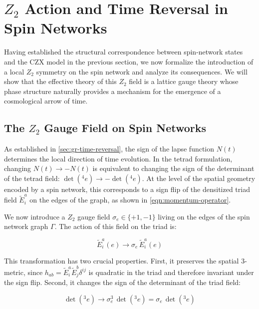 \section{\texorpdfstring{\(Z_2\) Action and Time Reversal in Spin Networks}{Z\_2 Action and Time Reversal in Spin Networks}}\label{sec:z2-action}

Having established the structural correspondence between spin-network states and the CZX model in the previous section, we now formalize the introduction of a local \(Z_2\) symmetry on the spin network and analyze its consequences. We will show that the effective theory of this \(Z_2\) field is a lattice gauge theory whose phase structure naturally provides a mechanism for the emergence of a cosmological arrow of time.

\subsection{\texorpdfstring{The \(Z_2\) Gauge Field on Spin Networks}{The Z\_2 Gauge Field on Spin Networks}}\label{subsec:z2-definition}

As established in \autoref{sec:gr-time-reversal}, the sign of the lapse function \(N(t)\) determines the local direction of time evolution. In the tetrad formulation, changing \(N(t) \rightarrow -N(t)\) is equivalent to changing the sign of the determinant of the tetrad field: \(\det({}^4 e) \rightarrow -\det({}^4 e)\). At the level of the spatial geometry encoded by a spin network, this corresponds to a sign flip of the densitized triad field \(\tilde E^a_i\) on the edges of the graph, as shown in \eqref{eqn:momentum-operator}.

We now introduce a \(Z_2\) gauge field \(\sigma_e \in \{+1, -1\}\) living on the edges of the spin network graph \(\Gamma\). The action of this field on the triad is:

\begin{equation}\label{eqn:z2-triad-action}
  \tilde E^a_i(e) \rightarrow \sigma_e \, \tilde E^a_i(e)
\end{equation}

This transformation has two crucial properties. First, it preserves the spatial 3-metric, since \(h_{ab} = \tilde E^a_i \tilde E^b_j \delta^{ij}\) is quadratic in the triad and therefore invariant under the sign flip. Second, it changes the sign of the determinant of the triad field:

\begin{equation}\label{eqn:z2-det-flip}
  \det({}^3 e) \rightarrow \sigma_e^3 \, \det({}^3 e) = \sigma_e \, \det({}^3 e)
\end{equation}

